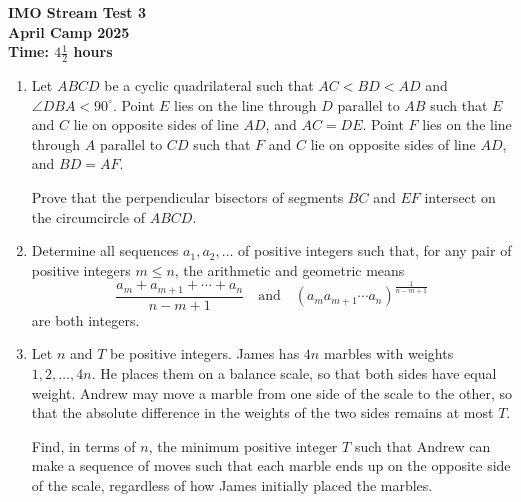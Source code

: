 \documentclass[12pt]{article}
\begin{document}
\thispagestyle{empty}

\begin{center}
  \bfseries
  \Large IMO Stream Test 3
  \\ \bigskip
  \large April Camp 2025
  \\ \bigskip
  Time: $4\frac{1}{2}$ hours
\end{center}

\bigskip
\begin{enumerate}[leftmargin=0pt,itemsep=\medskipamount]

\item Let $ABCD$ be a cyclic quadrilateral such that $AC < BD < AD$ and $\angle DBA < 90^{\circ}$.
Point $E$ lies on the line through $D$ parallel to $AB$ such that $E$ and $C$ lie on opposite sides of line $AD$, and $AC = DE$.
Point $F$ lies on the line through $A$ parallel to $CD$ such that $F$ and $C$ lie on opposite sides of line $AD$, and $BD = AF$.

Prove that the perpendicular bisectors of segments $BC$ and $EF$ intersect on the circumcircle of $ABCD$.

\item Determine all sequences $a_1,a_2,\ldots$ of positive integers such that, for any pair of positive integers $m\leqslant n$, the arithmetic and geometric means\[\frac{a_m+a_{m+1}+\cdots+a_n}{n-m+1}\quad\text{and}\quad {(a_ma_{m+1}\cdots a_n)}^{\frac{1}{n-m+1}}\]are both integers.

\item Let $n$ and $T$ be positive integers.
James has $4n$ marbles with weights $1, 2, \dotsc, 4n$.
He places them on a balance scale, so that both sides have equal weight.
Andrew may move a marble from one side of the scale to the other, so that the absolute difference in the weights of the two sides remains at most $T$.

Find, in terms of $n$, the minimum positive integer $T$ such that Andrew can make a sequence of moves such that each marble ends up on the opposite side of the scale, regardless of how James initially placed the marbles.

\end{enumerate}
\end{document}
